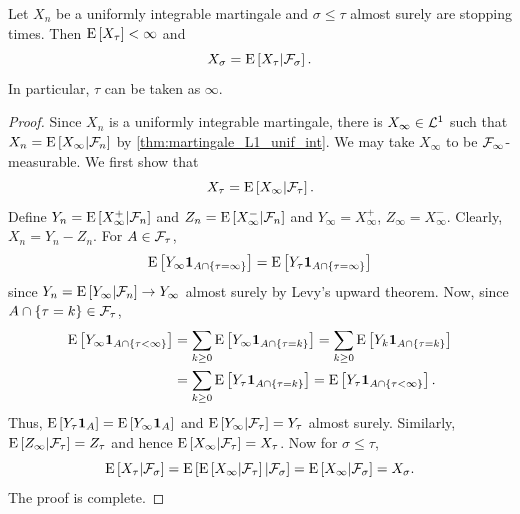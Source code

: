 \begin{theorem}
    Let $X_n$ be a uniformly integrable martingale and $\sigma\leq\tau$ almost 
    surely are stopping times. Then $\operatorname{E}\left[ {X_\tau} \right]<\infty$ and 
    \begin{equation*}
        X_\sigma = \operatorname{E}\left[ {X_\tau|\mathcal{F}_\sigma} \right].
    \end{equation*} 
    In particular, $\tau$ can be taken as $\infty$. 
\end{theorem}
\begin{proof}
    Since $X_n$ is a uniformly integrable martingale, there is $X_\infty\in\mathcal{L}^1$ 
    such that $X_n = \operatorname{E}\left[ {X_\infty|\mathcal{F}_n} \right]$ by \cref{thm:martingale_L1_unif_int}. 
    We may take $X_\infty$ to be $\mathcal{F}_\infty$-measurable. We first show that 
    \begin{equation*}
        X_\tau = \operatorname{E}\left[ {X_\infty|\mathcal{F}_\tau} \right]. 
    \end{equation*}
    Define $Y_n = \operatorname{E}\left[ {X_\infty^+|\mathcal{F}_n} \right]$ and $Z_n = \operatorname{E}\left[ {X_\infty^-|\mathcal{F}_n} \right]$ and 
    $Y_\infty = X_\infty^+$, $Z_\infty = X_\infty^-$. Clearly, $X_n = Y_n - Z_n$. 
    For $A\in\mathcal{F}_\tau$, 
    \begin{equation*}
        \operatorname{E}\left[ {Y_\infty\mathbf{1}_{A\cap\left\{ {\tau = \infty} \right\}}} \right] = \operatorname{E}\left[ {Y_\tau\mathbf{1}_{A\cap\left\{ {\tau = \infty} \right\}}} \right]
    \end{equation*}
    since $Y_n = \operatorname{E}\left[ {Y_\infty|\mathcal{F}_n} \right]\to Y_\infty$ almost surely by Levy's 
    upward theorem. Now, since $A\cap\left\{ {\tau = k} \right\}\in\mathcal{F}_\tau$, 
    \begin{equation*}
        \begin{split}
            \operatorname{E}\left[ {Y_\infty\mathbf{1}_{A\cap\left\{ {\tau < \infty} \right\}}} \right] 
            &= \sum_{k\geq 0}\operatorname{E}\left[ {Y_\infty\mathbf{1}_{A\cap\left\{ {\tau = k} \right\}}} \right] 
            = \sum_{k\geq 0}\operatorname{E}\left[ {Y_k\mathbf{1}_{A\cap\left\{ {\tau = k} \right\}}} \right] \\
            &= \sum_{k\geq 0}\operatorname{E}\left[ {Y_\tau\mathbf{1}_{A\cap\left\{ {\tau = k} \right\}}} \right]
            = \operatorname{E}\left[ {Y_\tau\mathbf{1}_{A\cap\left\{ {\tau < \infty} \right\}}} \right].
        \end{split}
    \end{equation*}
    Thus, $\operatorname{E}\left[ {Y_\tau\mathbf{1}_A} \right] = \operatorname{E}\left[ {Y_\infty\mathbf{1}_A} \right]$ and $\operatorname{E}\left[ {Y_\infty|\mathcal{F}_\tau} \right] = Y_\tau$ 
    almost surely. Similarly, $\operatorname{E}\left[ {Z_\infty|\mathcal{F}_\tau} \right] = Z_\tau$ and 
    hence $\operatorname{E}\left[ {X_\infty|\mathcal{F}_\tau} \right] = X_\tau$. Now for $\sigma\leq \tau$, 
    \begin{equation*}
        \operatorname{E}\left[ {X_\tau|\mathcal{F}_\sigma} \right] = \operatorname{E}\left[ {\operatorname{E}\left[ {X_\infty|\mathcal{F}_\tau} \right]|\mathcal{F}_\sigma} \right] 
        = \operatorname{E}\left[ {X_\infty|\mathcal{F}_\sigma} \right] = X_\sigma. 
    \end{equation*}
    The proof is complete. 
\end{proof}

